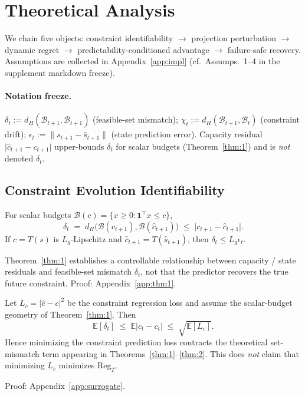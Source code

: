 \section{Theoretical Analysis}
\label{sec:theory}

We chain five objects: constraint identifiability $\rightarrow$ projection perturbation $\rightarrow$ dynamic regret $\rightarrow$ predictability-conditioned advantage $\rightarrow$ failure-safe recovery.
Assumptions are collected in Appendix~\ref{app:impl} (cf.\ Assumps.~1--4 in the supplement markdown freeze).

\paragraph{Notation freeze.}
$\delta_t:=d_H(\hat{\mathcal{B}}_{t+1},\mathcal{B}_{t+1})$ (feasible-set mismatch);
$\chi_t:=d_H(\mathcal{B}_{t+1},\mathcal{B}_t)$ (constraint drift);
$\epsilon_t:=\|s_{t+1}-\hat s_{t+1}\|$ (state prediction error).
Capacity residual $\lvert\hat c_{t+1}-c_{t+1}\rvert$ upper-bounds $\delta_t$ for scalar budgets (Theorem~\ref{thm:1}) and is \emph{not} denoted $\delta_t$.

\subsection{Constraint Evolution Identifiability}
\begin{theorem}
\label{thm:1}
For scalar budgets $\mathcal{B}(c)=\{x\ge 0:\mathbf{1}^\top x\le c\}$,
\begin{equation}
\delta_t
\;=\;
d_H\bigl(\mathcal{B}(c_{t+1}),\mathcal{B}(\hat c_{t+1})\bigr)
\;\le\;
\lvert c_{t+1}-\hat c_{t+1}\rvert.
\end{equation}
If $c=T(s)$ is $L_g$-Lipschitz and $\hat c_{t+1}=T(\hat s_{t+1})$, then
$\delta_t\le L_g\epsilon_t$.
\end{theorem}
Theorem~\ref{thm:1} establishes a controllable relationship between capacity / state residuals and feasible-set mismatch $\delta_t$, not that the predictor recovers the true future constraint.
Proof: Appendix~\ref{app:thm1}.

\begin{lemma}
\label{lem:surrogate}
Let $L_c=\lvert\hat c-c\rvert^2$ be the constraint regression loss and assume the scalar-budget geometry of Theorem~\ref{thm:1}.
Then
\begin{equation}
\mathbb{E}[\delta_t]
\;\le\;
\mathbb{E}\lvert\hat c_t-c_t\rvert
\;\le\;
\sqrt{\mathbb{E}[L_c]}.
\end{equation}
Hence minimizing the constraint prediction loss contracts the theoretical set-mismatch term appearing in Theorems~\ref{thm:1}--\ref{thm:2}.
This does \emph{not} claim that minimizing $L_c$ minimizes $\mathrm{Reg}_T$.
\end{lemma}
Proof: Appendix~\ref{app:surrogate}.

